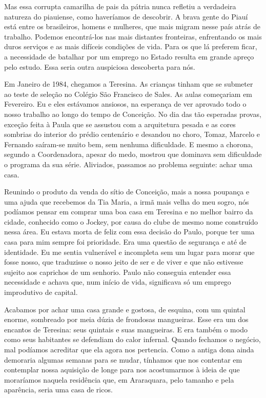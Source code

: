 Mas essa corrupta camarilha de pais da pátria nunca refletiu a verdadeira natureza do piauiense, como haveríamos de descobrir.
A brava gente do Piauí está entre os brasileiros, homens e mulheres, que mais migram nesse país atrás de trabalho.
Podemos encontrá-los nas mais distantes fronteiras, enfrentando os mais duros serviços e as mais difíceis condições de vida.
 Para os que lá preferem ficar, a necessidade de batalhar por um emprego no Estado resulta em grande apreço pelo estudo.
Essa seria outra auspiciosa descoberta para nós.

Em Janeiro de 1984, chegamos a Teresina.
As crianças tinham que se submeter ao teste de seleção no Colégio São Francisco de Sales.
As aulas começariam em Fevereiro.
Eu e eles estávamos ansiosos, na esperança de ver aprovado todo o nosso trabalho ao longo do tempo de Conceição.
No dia das tão esperadas provas, exceção feita à Paula que se assustou com a arquitetura pesada e as cores sombrias do interior do prédio centenário e desandou no choro, Tomaz, Marcelo e Fernando saíram-se muito bem, sem nenhuma dificuldade.
E mesmo a chorona, segundo a Coordenadora, apesar do medo, mostrou que dominava sem dificuldade o programa da sua série.
Aliviados, passamos ao problema seguinte: achar uma casa.

Reunindo o produto da venda do sítio de Conceição, mais a nossa poupança e uma ajuda que recebemos da Tia Maria, a irmã mais velha do meu sogro, nós podíamos pensar em comprar uma boa casa em Teresina e no melhor bairro da cidade, conhecido como o Jockey, por causa do clube de mesmo nome construído nessa área.
Eu estava morta de feliz com essa decisão do Paulo, porque ter uma casa para mim sempre foi prioridade.
Era uma questão de segurança e até de identidade.
Eu me sentia vulnerável e incompleta sem um lugar para morar que fosse nosso, que traduzisse o nosso jeito de ser e de viver e que não estivesse sujeito aos caprichos de um senhorio.
Paulo não conseguia entender essa necessidade e achava que, num início de vida, significava só um emprego improdutivo de capital.


Acabamos por achar uma casa grande e gostosa, de esquina, com um quintal enorme, sombreado por meia dúzia de frondosas mangueiras.
Esse era um dos encantos de Teresina: seus quintais e suas mangueiras.
E era também o modo como seus habitantes se defendiam do calor infernal.
Quando fechamos o negócio, mal podíamos acreditar que ela agora nos pertencia.
Como a antiga dona ainda demoraria algumas semanas para se mudar, tínhamos que nos contentar em contemplar nossa aquisição de longe para nos acostumarmos à ideia de que moraríamos naquela residência que, em Araraquara, pelo tamanho e pela aparência, seria uma casa de ricos.


